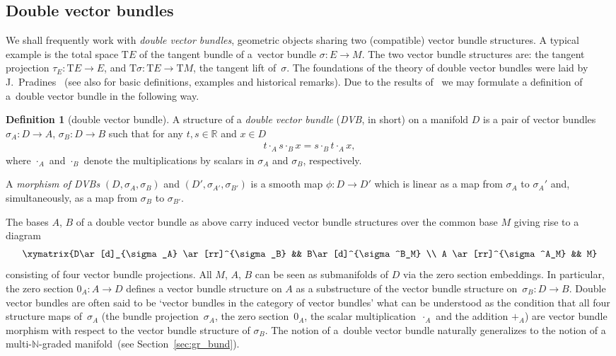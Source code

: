\documentclass[10pt,a4paper]{amsart}
\newcommand{\grB}{{$\N$-graded manifold}}
\newcommand{\R}{\mathbb{R}}
\newcommand{\N}{\mathbb{N}}
\newcommand{\ra}{\rightarrow}
\newcommand{\T}{\mathrm{T}} %
\numberwithin{equation}{section}
\theoremstyle{definition}
\newtheorem{df}[thm]{Definition}
\begin{document}
\subsection{Double vector bundles}
We shall frequently work with \emph{double vector bundles}, geometric objects sharing two (compatible) vector bundle structures. A typical example is the total space $\T E$ of the tangent bundle of a~vector bundle $\sigma\colon E\ra M$. The two vector bundle structures are: the tangent projection $\tau_E\colon \T E\ra E$, and $\T \sigma\colon \T E\ra \T M$, the tangent lift of~$\sigma$. The foundations of the theory of double vector bundles were laid by J.~Pradines~\cite{Pradines1977} (see also \cite[Chapter~9]{Mackenzie_lie_2005} for basic definitions, examples and historical remarks). Due to the results of~\cite{JG_MR_hi_VB_2009} we may formulate a definition of a~double vector bundle in the following way.
\begin{df}[double vector bundle]\label{df:DVB} A structure of a \emph{double vector bundle} (\emph{DVB}, in short) on a manifold $D$ is a pair of vector bundles $\sigma_A\colon D \ra A$, $\sigma_B\colon D \ra B$ such that for any $t, s\in\R$ and $x\in D$
\begin{gather}\label{eqn:DVB}
t\cdot_A s \cdot_B x = s\cdot_B t \cdot_A x,
\end{gather}
where $\cdot_A$ and $\cdot_B$ denote the multiplications by scalars in $\sigma_A$ and $\sigma_B$, respectively.

A \emph{morphism of DVBs} $(D,\sigma_A,\sigma_B)$ and $(D',\sigma_{A'},\sigma_{B'})$ is a smooth map $\phi\colon D\ra D'$ which is linear as a map from $\sigma_A$ to $\sigma_A'$ and, simultaneously, as a map from $\sigma_B$ to $\sigma_{B'}$.
\end{df}
The bases $A$, $B$ of a double vector bundle as above carry induced vector bundle structures over the common base $M$ giving rise to a diagram
\begin{gather*}
\xymatrix{D\ar[d]_{\sigma_A} \ar[rr]^{\sigma_B} && B\ar[d]^{\sigma^B_M} \\
A \ar[rr]^{\sigma^A_M} && M}
\end{gather*}
consisting of four vector bundle projections. All $M$, $A$, $B$ can be seen as submanifolds of $D$ via the zero section embeddings. In particular, the zero section $0_A\colon A\ra D$ defines a vector bundle structure on $A$ as a substructure of the vector bundle structure on~$\sigma_B\colon D\ra B$. Double vector bundles are often said to be `vector bundles in the category of vector bundles' what can be understood as the condition that all four structure maps of~$\sigma_A$ (the bundle projection~$\sigma_A$, the zero section~$0_A$, the scalar multiplication~$\cdot_A$ and the addition $+_A$) are vector bundle morphism with respect to the vector bundle structure of $\sigma_B$. The notion of a~double vector bundle naturally generalizes to the notion of a multi-\grB\ (see Section~\ref{sec:gr_bund}).
\end{document}
